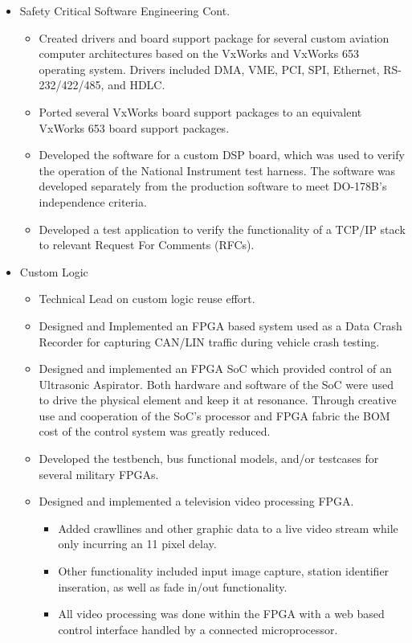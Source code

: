 \documentclass[print]{template/friggeri-cv} %
\begin{document}
\begin{entrylist}

\listentry
{\begin{itemize}
\item Safety Critical Software Engineering Cont.
\begin{itemize}
\item Created drivers and board support package for several custom aviation computer architectures based on the VxWorks and VxWorks 653 operating system.  Drivers included DMA, VME, PCI, SPI, Ethernet, RS-232/422/485, and HDLC.
\item Ported several VxWorks board support packages to an equivalent VxWorks 653 board support packages.
\item Developed the software for a custom DSP board, which was used to verify the operation of the National Instrument test harness.  The software was developed separately from the production software to meet DO-178B’s independence criteria.
\item Developed a test application to verify the functionality of a TCP/IP stack to relevant Request For Comments (RFCs).
\end{itemize}
\item Custom Logic
\begin{itemize}
\item Technical Lead on custom logic reuse effort.
\item Designed and Implemented an FPGA based system used as a Data Crash Recorder for capturing CAN/LIN traffic during vehicle crash testing.
\item Designed and implemented an FPGA SoC which provided control of an Ultrasonic Aspirator.  Both hardware and software of the SoC were used to drive the physical element and keep it at resonance.  Through creative use and cooperation of the SoC’s processor and FPGA fabric the BOM cost of the control system was greatly reduced.
\item Developed the testbench, bus functional models, and/or testcases for several military FPGAs.
\item Designed and implemented a television video processing FPGA.
\begin{itemize}
\item Added crawllines and other graphic data to a live video stream while only incurring an 11 pixel delay.
\item Other functionality included input image capture, station identifier inseration, as well as fade in/out functionality.
\item All video processing was done within the FPGA with a web based control interface handled by a connected microprocessor.

\end{itemize}
\end{itemize}
\end{itemize}}
\end{entrylist}
\end{document}

